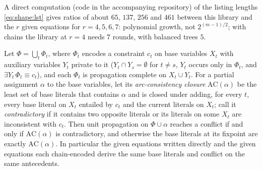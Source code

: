 A direct computation (code in the accompanying repository) of the listing lengths \eqref{eq:shape:lst} gives ratios of about $65$, $137$, $256$ and $461$ between this library and the $r$ given equations for $r=4,5,6,7$: polynomial growth, not $2^{(m-1)/2}$; with chains the library at $r=4$ needs $7$ rounds, with balanced trees $5$.

\begin{proposition}\label{prop:shape:private}
Let $\Phi=\bigcup_t\Phi_t$, where $\Phi_t$ encodes a constraint $c_t$ on base variables $X_t$ with auxiliary variables $Y_t$ private to it ($Y_t\cap Y_s=\emptyset$ for $t\ne s$, $Y_t$ occurs only in $\Phi_t$, and $\exists Y_t\,\Phi_t\equiv c_t$), and each $\Phi_t$ is propagation complete on $X_t\cup Y_t$. For a partial assignment $\alpha$ to the base variables, let its \emph{arc-consistency closure} $\mathrm{AC}(\alpha)$ be the least set of base literals that contains $\alpha$ and is closed under adding, for every $t$, every base literal on $X_t$ entailed by $c_t$ and the current literals on $X_t$; call it \emph{contradictory} if it contains two opposite literals or its literals on some $X_t$ are inconsistent with $c_t$. Then unit propagation on $\Phi\cup\alpha$ reaches a conflict if and only if $\mathrm{AC}(\alpha)$ is contradictory, and otherwise the base literals at its fixpoint are exactly $\mathrm{AC}(\alpha)$. In particular the given equations written directly and the given equations each chain-encoded derive the same base literals and conflict on the same antecedents.
\end{proposition}

